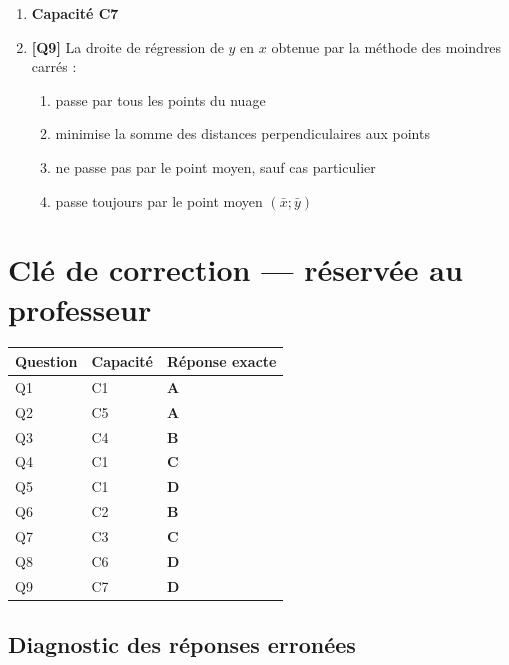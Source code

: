 \begin{enumerate}
\item[] \textbf{Capacité C7}

\item \textbf{[Q9]} La droite de régression de $y$ en $x$ obtenue par la méthode des moindres carrés :
  \begin{enumerate}[label=\Alph*.]
    \item passe par tous les points du nuage
    \item minimise la somme des distances perpendiculaires aux points
    \item ne passe pas par le point moyen, sauf cas particulier
    \item passe toujours par le point moyen $(\bar x;\bar y)$
  \end{enumerate}

\end{enumerate}

\ifnxVersionProfesseur
\clearpage
\section*{Clé de correction — réservée au professeur}

\begin{center}
\begin{tabular}{lll}
\hline
Question & Capacité & Réponse exacte \\
\hline
Q1 & C1 & \textbf{A} \\
Q2 & C5 & \textbf{A} \\
Q3 & C4 & \textbf{B} \\
Q4 & C1 & \textbf{C} \\
Q5 & C1 & \textbf{D} \\
Q6 & C2 & \textbf{B} \\
Q7 & C3 & \textbf{C} \\
Q8 & C6 & \textbf{D} \\
Q9 & C7 & \textbf{D} \\
\hline
\end{tabular}
\end{center}

\subsection*{Diagnostic des réponses erronées}

